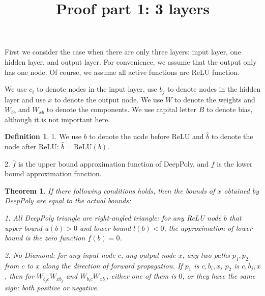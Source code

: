 \documentclass[]{article}
\title{Proof part 1: 3 layers}
\date{}
\newtheorem{theorem}{Theorem}
\theoremstyle{definition}
\newtheorem{definition}{Definition}
\newcommand{\ReLU}{\mathrm{ReLU}}
\begin{document}
\maketitle


First we consider the case when there are only three layers: input layer, one hidden layer, and output layer. For convenience, we assume that the output only has one node. Of course, we assume all active functions are ReLU function.

We use $c_i$ to denote nodes in the input layer, use $b_j$ to denote nodes in the hidden layer and use $x$ to denote the output node. We use $W$ to denote the weights and $W_{bc}$ and $W_{xb}$ to denote the components. We use capital letter $B$ to denote bias, although it is not important here.



\begin{definition}
	1. We use $b$ to denote the node before ReLU and $\hat{b}$ to denote the node after ReLU: $\hat{b} = \ReLU(b)$.
	
	2. $\bar{f}$ is the upper bound approximation function of DeepPoly, and $\underline{f}$ is the lower bound approximation function.
\end{definition}



\begin{theorem}
	If there following conditions holds, then the bounds of $x$ obtained by DeepPoly are equal to the actual bounds:
	
	1. All DeepPoly triangle are right-angled triangle: for any ReLU node $b$ that upper bound $u(b)>0$ and lower bound $l(b)<0$, the approximation of lower bound is the zero function $\underline{f}(b)=0$.
	
	2. No Diamond: for any input node $c$, any output node $x$, any two paths $p_1,p_2$ from $c$ to $x$ along the direction of forward propagation. If $p_1$ is $c,b_i,x$, $p_2$ is $c,b_j,x$, then for $W_{b_jc}W_{xb_j}$ and $W_{b_ic}W_{xb_i}$, either one of them is $0$, or they have the same sign: both positive or negative.
\end{theorem}
\end{document}
